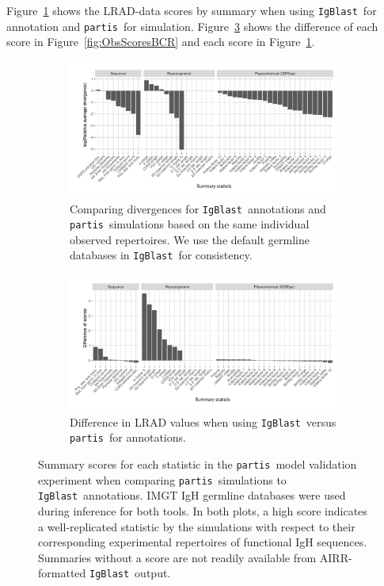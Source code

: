 \documentclass{article}
\newcommand{\partis}{\texttt{partis}}
\newcommand{\igblast}{\texttt{IgBlast}}
\begin{document}
Figure~\ref{fig:IgBlastScores} shows the LRAD-data scores by summary when using \igblast\ for annotation and \partis\ for simulation.
Figure~\ref{fig:ScoreDiffs} shows the difference of each score in Figure~\ref{fig:ObsScoresBCR} and each score in Figure~\ref{fig:IgBlastScores}.
\begin{figure}
	\begin{subfigure}{\textwidth}
   		\includegraphics[width=\linewidth]{Figures/PartisScores/obs_score_plot_igb.pdf}
    	\caption{Comparing divergences for \igblast\ annotations and \partis\ simulations based on the same individual observed repertoires.
    	    We use the default germline databases in \igblast\ for consistency.
    	}
    	\label{fig:IgBlastScores}
	\end{subfigure}
	\begin{subfigure}{\textwidth}
   		\includegraphics[width=\linewidth]{Figures/PartisScores/score_diff.pdf}
    	\caption{Difference in LRAD values when using \igblast\ versus \partis\ for annotations.
    	}
    	\label{fig:ScoreDiffs}
	\end{subfigure}
	\caption{Summary scores for each statistic in the \partis\ model validation experiment when comparing \partis\ simulations to \igblast\ annotations.
	IMGT IgH germline databases were used during inference for both tools.
	In both plots, a high score indicates a well-replicated statistic by the simulations with respect to their corresponding experimental repertoires of functional IgH sequences.
	Summaries without a score are not readily available from AIRR-formatted \igblast\ output.
	}
\end{figure}
\end{document}
